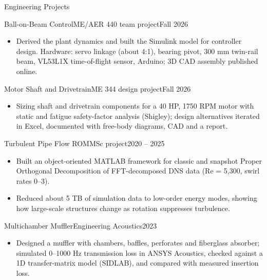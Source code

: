 \documentclass[]{mcdowellcv}
\begin{document}
\begin{cvsection}{Engineering Projects}
  \begin{cvsubsection}{Ball-on-Beam Control}{ME/AER 440 team project}{Fall 2026}
    \begin{itemize}
      \item Derived the plant dynamics and built the Simulink model for controller design. Hardware: servo linkage (about 4:1), bearing pivot, 300 mm twin-rail beam, VL53L1X time-of-flight sensor, Arduino; 3D CAD assembly published online.
    \end{itemize}
  \end{cvsubsection}

  \begin{cvsubsection}{Motor Shaft and Drivetrain}{ME 344 design project}{Fall 2026}
    \begin{itemize}
      \item Sizing shaft and drivetrain components for a 40 HP, 1750 RPM motor with static and fatigue safety-factor analysis (Shigley); design alternatives iterated in Excel, documented with free-body diagrams, CAD and a report.
    \end{itemize}
  \end{cvsubsection}

  \begin{cvsubsection}{Turbulent Pipe Flow ROM}{MSc project}{2020 -- 2025}
    \begin{itemize}
      \item Built an object-oriented MATLAB framework for classic and snapshot Proper Orthogonal Decomposition of FFT-decomposed DNS data (Re = 5,300, swirl rates 0--3).
      \item Reduced about 5 TB of simulation data to low-order energy modes, showing how large-scale structures change as rotation suppresses turbulence.
    \end{itemize}
  \end{cvsubsection}

  \begin{cvsubsection}{Multichamber Muffler}{Engineering Acoustics}{2023}
    \begin{itemize}
      \item Designed a muffler with chambers, baffles, perforates and fiberglass absorber; simulated 0--1000 Hz transmission loss in ANSYS Acoustics, checked against a 1D transfer-matrix model (SIDLAB), and compared with measured insertion loss.
    \end{itemize}
  \end{cvsubsection}


\end{cvsection}
\end{document}
